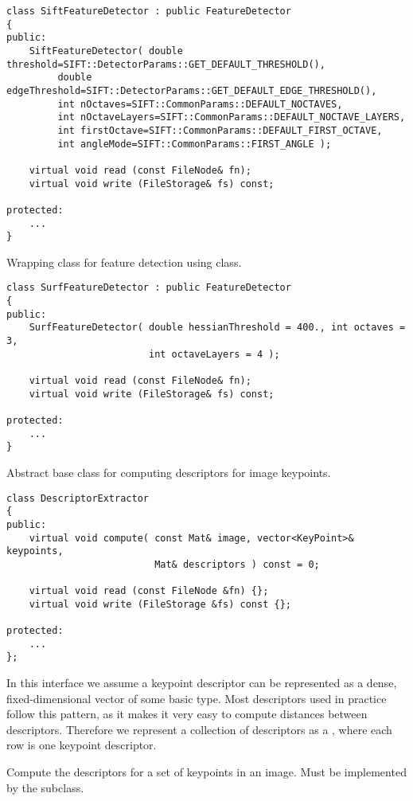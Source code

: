 \begin{lstlisting}
class SiftFeatureDetector : public FeatureDetector
{
public:
    SiftFeatureDetector( double threshold=SIFT::DetectorParams::GET_DEFAULT_THRESHOLD(),
		 double edgeThreshold=SIFT::DetectorParams::GET_DEFAULT_EDGE_THRESHOLD(),
		 int nOctaves=SIFT::CommonParams::DEFAULT_NOCTAVES,
		 int nOctaveLayers=SIFT::CommonParams::DEFAULT_NOCTAVE_LAYERS,
		 int firstOctave=SIFT::CommonParams::DEFAULT_FIRST_OCTAVE,
		 int angleMode=SIFT::CommonParams::FIRST_ANGLE );
    
    virtual void read (const FileNode& fn);
    virtual void write (FileStorage& fs) const;
    
protected:
	...
}
\end{lstlisting}

Wrapping class for feature detection using  class.

\begin{lstlisting}
class SurfFeatureDetector : public FeatureDetector
{
public:
    SurfFeatureDetector( double hessianThreshold = 400., int octaves = 3,
                         int octaveLayers = 4 );
    
    virtual void read (const FileNode& fn);
    virtual void write (FileStorage& fs) const;
    
protected:
	...
}
\end{lstlisting}

Abstract base class for computing descriptors for image keypoints.

\begin{lstlisting}
class DescriptorExtractor
{
public:
    virtual void compute( const Mat& image, vector<KeyPoint>& keypoints,
                          Mat& descriptors ) const = 0;

    virtual void read (const FileNode &fn) {};
    virtual void write (FileStorage &fs) const {};

protected:
    ...
};
\end{lstlisting}
In this interface we assume a keypoint descriptor can be represented as a
dense, fixed-dimensional vector of some basic type. Most descriptors used
in practice follow this pattern, as it makes it very easy to compute
distances between descriptors. Therefore we represent a collection of
descriptors as a , where each row is one keypoint descriptor.

Compute the descriptors for a set of keypoints in an image. Must be implemented by the subclass.

